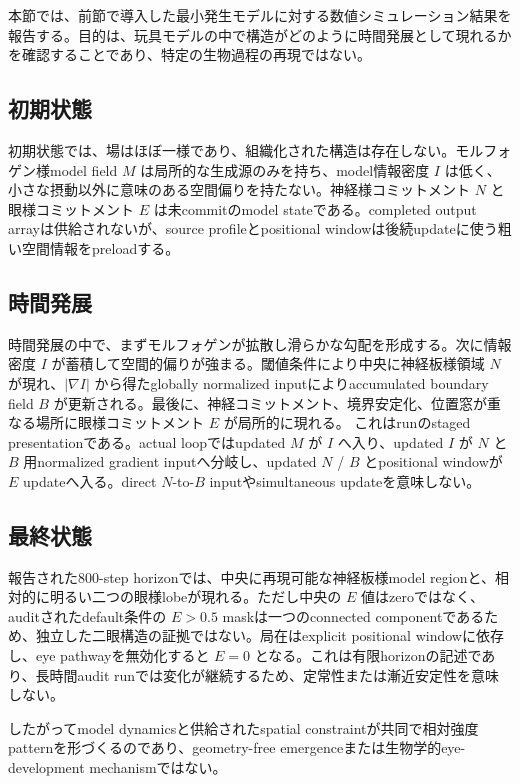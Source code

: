 \documentclass[11pt]{ltjsarticle}
\newcommand{\I}{I}
\begin{document}
本節では、前節で導入した最小発生モデルに対する数値シミュレーション結果を報告する。目的は、玩具モデルの中で構造がどのように時間発展として現れるかを確認することであり、特定の生物過程の再現ではない。

\subsection{初期状態}

初期状態では、場はほぼ一様であり、組織化された構造は存在しない。モルフォゲン様model field \(M\) は局所的な生成源のみを持ち、model情報密度 \(\I\) は低く、小さな摂動以外に意味のある空間偏りを持たない。神経様コミットメント \(N\) と眼様コミットメント \(E\) は未commitのmodel stateである。completed output arrayは供給されないが、source profileとpositional windowは後続updateに使う粗い空間情報をpreloadする。

\subsection{時間発展}

時間発展の中で、まずモルフォゲンが拡散し滑らかな勾配を形成する。次に情報密度 \(\I\) が蓄積して空間的偏りが強まる。閾値条件により中央に神経板様領域 \(N\) が現れ、\(|\nabla\I|\) から得たglobally normalized inputによりaccumulated boundary field \(B\) が更新される。最後に、神経コミットメント、境界安定化、位置窓が重なる場所に眼様コミットメント \(E\) が局所的に現れる。
これはrunのstaged presentationである。actual loopではupdated \(M\) が \(\I\) へ入り、updated \(\I\) が \(N\) と \(B\) 用normalized gradient inputへ分岐し、updated \(N\) / \(B\) とpositional windowが \(E\) updateへ入る。direct \(N\)-to-\(B\) inputやsimultaneous updateを意味しない。

\subsection{最終状態}

報告された800-step horizonでは、中央に再現可能な神経板様model regionと、相対的に明るい二つの眼様lobeが現れる。ただし中央の \(E\) 値はzeroではなく、auditされたdefault条件の \(E>0.5\) maskは一つのconnected componentであるため、独立した二眼構造の証拠ではない。局在はexplicit positional windowに依存し、eye pathwayを無効化すると \(E=0\) となる。これは有限horizonの記述であり、長時間audit runでは変化が継続するため、定常性または漸近安定性を意味しない。

したがってmodel dynamicsと供給されたspatial constraintが共同で相対強度patternを形づくるのであり、geometry-free emergenceまたは生物学的eye-development mechanismではない。
\end{document}
